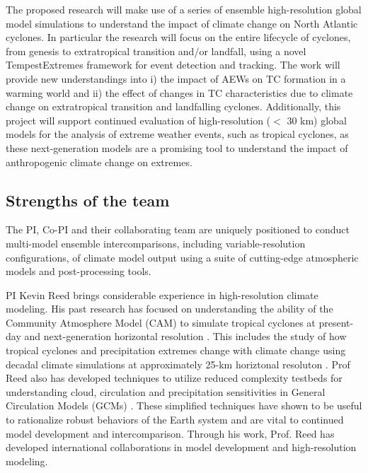 \documentclass[11pt]{article}
\begin{document}
The proposed research will make use of a series of ensemble high-resolution global model simulations to understand the impact of climate change on  North Atlantic cyclones. In particular the research will focus on the entire lifecycle of cyclones, from genesis to extratropical transition and/or landfall, using a novel TempestExtremes framework for event detection and tracking.  The work will provide new understandings into i) the impact of AEWs on TC formation in a warming world and ii) the effect of changes in TC characteristics due to climate change on extratropical transition and landfalling cyclones. Additionally, this project will support continued evaluation of high-resolution ($<$ 30 km) global models for the analysis of extreme weather events, such as tropical cyclones, as these next-generation models are a promising tool to understand the impact of anthropogenic climate change on extremes.  

\subsection{Strengths of the team}

The PI, Co-PI and their collaborating team are uniquely positioned to conduct multi-model ensemble intercomparisons, including variable-resolution configurations, of climate model output using a suite of cutting-edge atmospheric models and post-processing tools.

PI Kevin Reed brings considerable experience in high-resolution climate modeling.  His past research has focused on understanding the ability of the Community Atmosphere Model (CAM) to simulate tropical cyclones at present-day and next-generation horizontal resolution \citep{Reed2011a,Reed2011c,Reed2012b}.  This includes the study of how tropical cyclones and precipitation extremes change with climate change using decadal climate simulations at approximately 25-km horiztonal resoluton \citep{Wehner2014,Villarini2014,Wehner2015,Reed2015b}. Prof Reed also has developed techniques to utilize reduced complexity testbeds for understanding cloud, circulation and precipitation sensitivities in General Circulation Models (GCMs) \citep{Reed2012a,Reed2015a}. These simplified techniques have shown to be useful to rationalize robust behaviors of the Earth system and are vital to continued model development and intercomparison. Through his work, Prof. Reed has developed international collaborations in model development and high-resolution modeling.
\end{document}

